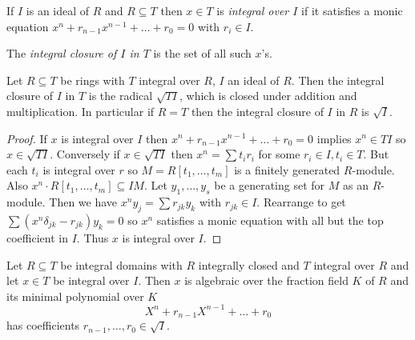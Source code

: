 \documentclass[a4paper]{article}
\begin{document}
\begin{definition}
  If \(I\) is an ideal of \(R\) and \(R \subseteq T\) then \(x \in T\) is \emph{integral over \(I\)} if it satisfies a monic equation \(x^n + r_{n - 1} x^{n - 1} + \dots + r_0 = 0\) with \(r_i \in I\).

  The \emph{integral closure of \(I\) in \(T\)} is the set of all such \(x\)'s.
\end{definition}

\begin{lemma}
  Let \(R \subseteq T\) be rings with \(T\) integral over \(R\), \(I\) an ideal of \(R\). Then the integral closure of \(I\) in \(T\) is the radical \(\sqrt{TI}\), which is closed under addition and multiplication. In particular if \(R = T\) then the integral closure of \(I\) in \(R\) is \(\sqrt I\).
\end{lemma}

\begin{proof}
  If \(x\) is integral over \(I\) then \(x^n + r_{n - 1} x^{n - 1} + \dots + r_0 = 0\) implies \(x^n \in TI\) so \(x \in \sqrt{TI}\). Conversely if \(x \in \sqrt{TI}\) then \(x^n = \sum t_ir_i\) for some \(r_i \in I, t_i \in T\). But each \(t_i\) is integral over \(r\) so \(M = R[t_1, \dots, t_m]\) is a finitely generated \(R\)-module. Also \(x^n \cdot R[t_1, \dots, t_m] \subseteq IM\). Let \(y_1, \dots, y_s\) be a generating set for \(M\) as an \(R\)-module. Then we have \(x^n y_j = \sum r_{jk} y_k\) with \(r_{jk} \in I\). Rearrange to get \(\sum (x^n \delta_{jk} - r_{jk}) y_k = 0\) so \(x^n\) satisfies a monic equation with all but the top coefficient in \(I\). Thus \(x\) is integral over \(I\).
\end{proof}

\begin{lemma}
  \label{lem:coefficient of min poly of an element integral over an ideal}
  Let \(R \subseteq T\) be integral domains with \(R\) integrally closed and \(T\) integral over \(R\) and let \(x \in T\) be integral over \(I\). Then \(x\) is algebraic over the fraction field \(K\) of \(R\) and its minimal polynomial over \(K\)
  \[
    X^n + r_{n - 1} X^{n - 1} + \dots + r_0
    \tag{\dagger}
  \]
  has coefficients \(r_{n - 1}, \dots, r_0 \in \sqrt I\).
\end{lemma}
\end{document}

